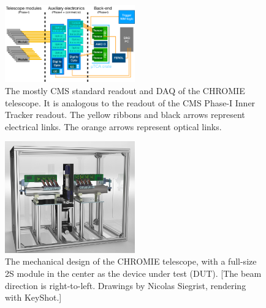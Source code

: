 \documentclass[a4paper,11pt]{article}
\begin{document}
\begin{figure}[htbp]
	\centering %
	\includegraphics[width=0.5\textwidth,origin=c,angle=0]{E2D5Av.png}
	\caption{\label{fig:1} The mostly CMS standard readout and DAQ of the CHROMIE telescope. It is analogous to the readout of the CMS Phase-I Inner Tracker readout. The yellow ribbons and black arrows represent electrical links. The orange arrows represent optical links.}
\end{figure}

\begin{figure}[htbp]
	\centering %
	\includegraphics[width=0.5\textwidth,origin=c,angle=0]{Modified1.png}
	\caption{\label{fig:2} The mechanical design of the CHROMIE telescope, with a full-size 2S module in the center as the device under test (DUT). [The beam direction is right-to-left. Drawings by Nicolas Siegrist, rendering with KeyShot.]}
\end{figure}
\end{document}
